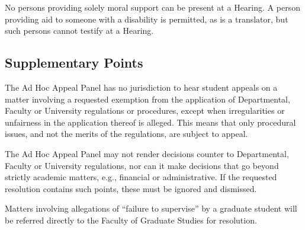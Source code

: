 \p No persons providing solely moral support can be present at a
Hearing.  A person providing aid to someone with a disability is permitted, as
is a translator, but such persons cannot testify at a Hearing.


\subsection{Supplementary Points}

\cp

\p The Ad Hoc Appeal Panel has no jurisdiction to hear student appeals
on a matter involving a requested exemption from the application of
Departmental, Faculty or University regulations or procedures, except when
irregularities or unfairness in the application thereof is alleged.  This means
that only procedural issues, and not the merits of the regulations, are subject
to appeal.

\p The Ad Hoc Appeal Panel may not render decisions counter to
Departmental, Faculty or University regulations, nor can it make decisions that
go beyond strictly academic matters, e.g., financial or administrative.  If the
requested resolution contains such points, these must be ignored and dismissed.   

\p Matters involving allegations of ``failure to supervise'' by a
graduate student will be referred directly to the Faculty of Graduate Studies
for resolution.  


